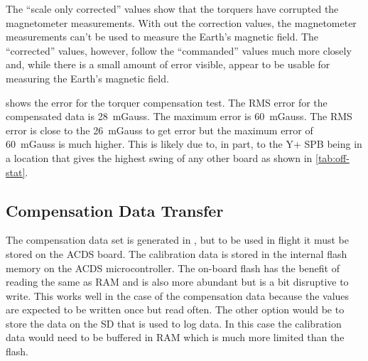 The \enquote{scale only corrected} values show that the torquers have corrupted the magnetometer measurements. With out the correction values, the magnetometer measurements can't be used to measure the Earth's magnetic field. The \enquote{corrected} values, however, follow the \enquote{commanded} values much more closely and, while there is a small amount of error visible, appear to be usable for measuring the Earth's magnetic field.


 shows the error for the torquer compensation test. The RMS error for the compensated data is 28~mGauss. The maximum error is 60~mGauss. The RMS error is close to the 26~mGauss to get {\textdegree} error but the maximum error of 60~mGauss is much higher. This is likely due to, in part, to the Y+ \ac{SPB} being in a location that gives the highest swing of any other board as shown in \cref{tab:off-stat}.


\subsection{Compensation Data Transfer}

The compensation data set is generated in \matlab, but to be used in flight it must be stored on the \ac{ACDS} board. The calibration data is stored in the internal flash memory on the \ac{ACDS} microcontroller. The on-board flash has the benefit of reading the same as \ac{RAM} and is also more abundant but is a bit disruptive to write. This works well in the case of the compensation data because the values are expected to be written once but read often. The other option would be to store the data on the \ac{SD} that is used to log data. In this case the calibration data would need to be buffered in \ac{RAM} which is much more limited than the flash. 


